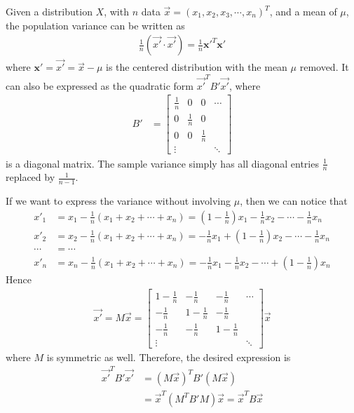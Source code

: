 \begin{proper}
Given a distribution $X$, with $n$ data $\vec{x} = (x_1, x_2, x_3, \cdots, x_n)^T$, and a mean of $\mu$, the population variance can be written as
\begin{align*}
\frac{1}{n} (\vec{x'}\cdot\vec{x'}) = \frac{1}{n} \textbf{x}'^T \textbf{x}'
\end{align*}
where $\textbf{x}' = \vec{x'} = \vec{x} - \mu$ is the centered distribution with the mean $\mu$ removed. It can also be expressed as the quadratic form $\vec{x'}^T B'\vec{x'}$, where
\begin{align*}
B' &=
\begin{bmatrix}
\frac{1}{n} & 0 & 0 & \cdots \\
0 & \frac{1}{n} & 0 & \\
0 & 0 & \frac{1}{n} & \\
\vdots & & & \ddots
\end{bmatrix}
\end{align*}
is a diagonal matrix. The sample variance simply has all diagonal entries $\frac{1}{n}$ replaced by $\frac{1}{n-1}$.
\end{proper}
If we want to express the variance without involving $\mu$, then we can notice that
\begin{align*}
x'_1 &= x_1 - \frac{1}{n}(x_1 + x_2 + \cdots + x_n) = (1-\frac{1}{n})x_1 - \frac{1}{n} x_2 - \cdots - \frac{1}{n} x_n \\
x'_2 &= x_2 - \frac{1}{n}(x_1 + x_2 + \cdots + x_n) = -\frac{1}{n} x_1 + (1-\frac{1}{n}) x_2 - \cdots - \frac{1}{n} x_n \\
\cdots &= \cdots \\
x'_n &= x_n - \frac{1}{n}(x_1 + x_2 + \cdots + x_n) = -\frac{1}{n} x_1 - \frac{1}{n} x_2 - \cdots +(1-\frac{1}{n}) x_n 
\end{align*}
Hence
\begin{align*}
\vec{x'} = M\vec{x} = 
\begin{bmatrix}
1-\frac{1}{n} & -\frac{1}{n} & -\frac{1}{n} & \cdots \\
-\frac{1}{n} & 1-\frac{1}{n} & -\frac{1}{n} & \\
-\frac{1}{n} & -\frac{1}{n} & 1-\frac{1}{n} & \\
\vdots & & & \ddots
\end{bmatrix}
\vec{x}
\end{align*}
where $M$ is symmetric as well. Therefore, the desired expression is
\begin{align*}
\vec{x'}^T B'\vec{x'} &= (M\vec{x})^T B' (M\vec{x}) \\
&= \vec{x}^T (M^TB' M) \vec{x} = \vec{x}^T B \vec{x}
\end{align*}
